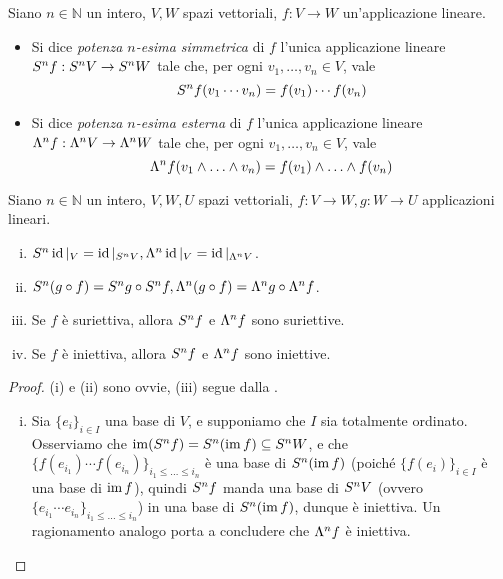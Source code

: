 \begin{definition}
Siano $n\in\mathbb{N}$ un intero, $V\comma W$ spazi vettoriali, $f:V\to W$ un'applicazione lineare.
\begin{itemize}
\item Si dice \emph{potenza $n$-esima simmetrica} di $f$ l'unica applicazione lineare $S^nf:S^nV\to S^nW$ tale che, per ogni $v_1,\ldots,v_n\in V$, vale 
$$
S^nf(v_1\cdots v_n)=f(v_1)\cdots f(v_n)
$$
\item Si dice \emph{potenza $n$-esima esterna} di $f$ l'unica applicazione lineare $\Lambda^nf:\Lambda^nV\to\Lambda^nW$ tale che, per ogni $v_1,\ldots,v_n\in V$, vale
$$
\Lambda^nf(v_1\wedge\ldots\wedge v_n)=f(v_1)\wedge\ldots\wedge f(v_n)
$$
\end{itemize}
\end{definition}

\begin{proposition}
Siano $n\in\mathbb{N}$ un intero, $V\comma W\comma U$ spazi vettoriali, $f:V\to W\comma g:W\to U$ applicazioni lineari.
\begin{enumerate}[(i)]
\item $S^n\operatorname{id}|_V=\operatorname{id}|_{S^nV},\allowbreak \Lambda^n\operatorname{id}|_V=\operatorname{id}|_{\Lambda^nV}$.
\item $S^n(g\circ f)=S^ng\circ S^nf,\allowbreak \Lambda^n(g\circ f)=\Lambda^ng\circ\Lambda^nf$.
\item Se $f$ è suriettiva, allora $S^nf$ e $\Lambda^nf$ sono suriettive.
\item Se $f$ è iniettiva, allora $S^nf$ e $\Lambda^nf$ sono iniettive.
\end{enumerate}
\end{proposition}
\begin{proof}
(i) e (ii) sono ovvie, (iii) segue dalla .
\begin{enumerate}[(i)]
\addtocounter{enumi}{3}
\item Sia $\{e_i\}_{i\in I}$ una base di $V$, e supponiamo che $I$ sia totalmente ordinato. Osserviamo che $\operatorname{im}(S^nf)=S^n(\operatorname{im} f)\subseteq S^nW$, e che $\{f(e_{i_1})\cdots f(e_{i_n})\}_{i_1\le\ldots\le i_n}$ è una base di $S^n(\operatorname{im} f)$ (poiché $\{f(e_i)\}_{i\in I}$ è una base di $\operatorname{im} f$), quindi $S^n f$ manda una base di $S^nV$ (ovvero $\{e_{i_1}\cdots e_{i_n}\}_{i_1\le\ldots\le i_n}$) in una base di $S^n(\operatorname{im} f)$, dunque è iniettiva. Un ragionamento analogo porta a concludere che $\Lambda^n f$ è iniettiva.
\end{enumerate}
\end{proof}

